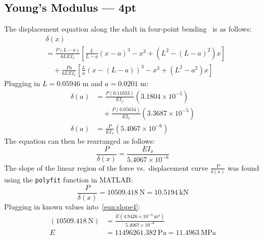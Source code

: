 \documentclass[conference, letterpaper]{IEEEtran}
\begin{document}
        \subsection{Young's Modulus --- 4pt}\label{apdx_ac}
            The displacement equation along the shaft in four-point bending~\cite{3LM2023} is as follows:
            \begin{align*}
                &\delta (x) \\
                &= \frac{P(L-a)}{6LE{I_x}}
                \left[ \frac{L}{L-a} {(x-a)}^3 - x^3 + (L^2 - {(L-a)}^2)x \right] \\
                &\quad + \frac{Pa}{6LE{I_x}}
                \left[ \frac{L}{a} {\left( x - (L-a) \right) }^3 - x^3 + (L^2 - a^2)x \right]
            \end{align*}
            Plugging in \(L = 0.05946\) m and \(a = 0.0201\) m:
            \begin{align*}
                \delta (a)
                &= \frac{P(0.11033)}{E{I_x}} \left( 3.1804\times10^{-5} \right) \\
                &\quad + \frac{P(0.05634)}{E{I_x}} \left( 3.3687\times10^{-5} \right) \\
                \delta (a) &= \frac{P}{E{I_x}} \left( 5.4067\times10^{-6} \right)
            \end{align*}
            The equation can then be rearranged as follows:
            \begin{equation}\label{eqn:slope4}
                \frac{P}{\delta (x)}
                = \frac{E{I_x}}{5.4067\times10^{-6}}
            \end{equation}
            The slope of the linear region of the force vs.\ displacement curve \(\frac{P}{\delta (x)}\) was found using the \texttt{polyfit} function in MATLAB:\@
            \[
                \frac{P}{\delta (x)} 
                = 10509.418\ \text{N}
                = 10.5194\ \text{kN}
            \]
            Plugging in known values into~\eqref{eqn:slope4}:
            \begin{align*}
                (10509.418\ \text{N})
                &= \frac{E(4.9426\times10^{-9}\ \text{m}^4)}{5.4067\times10^{-6}} \\
                E 
                &= 11496261.382\ \text{Pa}
                = 11.4963\ \text{MPa}
            \end{align*}
\end{document}
